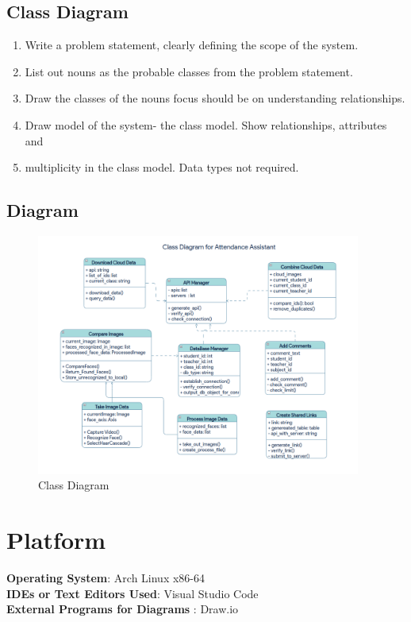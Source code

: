 \documentclass[11pt]{article}
\begin{document}
\subsection{Class Diagram}
\begin{enumerate}
	\item Write a problem statement, clearly defining the scope of the system.
	\item List out nouns as the probable classes from the problem statement.
	\item Draw the classes of the nouns focus should be on understanding relationships.
	\item Draw model of the system- the class model. Show relationships, attributes and
	\item multiplicity in the class model. Data types not required.
\end{enumerate}

\subsection{Diagram}

\begin{figure}[H]
\centering
\includegraphics[width=0.95\textwidth]{Screenshot_on_2023-05-02_at_05-23-28.png}
\caption{Class Diagram}
\end{figure}

\section{Platform}
\textbf{Operating System}: Arch Linux x86-64 \\
\textbf{IDEs or Text Editors Used}: Visual Studio Code\\
\textbf{External Programs for Diagrams} : Draw.io\\
\end{document}
